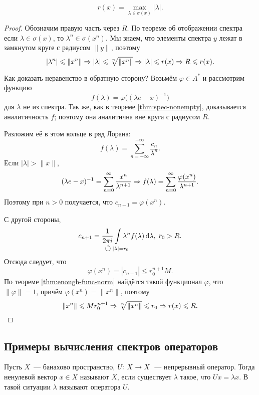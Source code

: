 \documentclass{notes}
\begin{document}
	\begin{thm}
		\[	
			r(x) = \max\limits_{\lambda \in \sigma(x)} |\lambda|.
		\]
		\begin{proof}
			Обозначим правую часть через $R$. По теореме об отображении спектра если $\lambda \in \sigma(x)$, то $\lambda^n \in \sigma(x^n)$. Мы знаем, что элементы спектра $y$ лежат в замкнутом круге с радиусом $\|y\|$, поэтому
			\[
				|\lambda^n| \leqslant \|x^n\| \Rightarrow |\lambda| \leqslant \sqrt[n]{\|x^n\|} \Rightarrow |\lambda| \leqslant r(x) \Rightarrow R \leqslant r(x).
			\]

			Как доказать неравенство в обратную сторону? Возьмём $\varphi \in A^{*}$ и рассмотрим функцию 
			\[
				f(\lambda) = \varphi\big((\lambda e - x)^{-1}\big)
			\]
			для $\lambda$ не из спектра. Так же, как в теореме \ref{thm:spec-nonempty}, доказывается аналитичность $f$; поэтому она аналитична вне круга с радиусом $R$.

			Разложим её в этом кольце в ряд Лорана:
			\[
				f(\lambda) = \sum\limits_{n = -\infty}^{+\infty} \dfrac{c_n}{\lambda^n}.
			\]
			Если $|\lambda| > \|x\|$, 
			\[
				(\lambda e - x)^{-1} = \sum\limits_{n = 0}^{\infty} \dfrac{x^n}{\lambda^{n + 1}} \Rightarrow f(\lambda) = \sum\limits_{n = 0}^{\infty} \dfrac{\varphi(x^n)}{\lambda^{n + 1}}.
			\]
			Поэтому при $n>0$ получается, что $c_{n + 1} = \varphi(x^n)$.

			С другой стороны, 
			\[
				c_{n + 1} = \dfrac{1}{2 \pi i} \int\limits_{\mathclap{\leftturn \, |\lambda| = r_0}} \lambda^n f(\lambda) \D \lambda, \; r_0 > R.
			\]
			Отсюда следует, что
			\[
				\varphi(x^n) = |c_{n + 1}| \leqslant r_0^{n + 1} M.
			\]
			По теореме \ref{thm:enough-func-norm} найдётся такой функционал $\varphi$, что $\|\varphi\| = 1$, причём $\varphi(x^n) = \|x^n\|$, поэтому
			\[
				\|x^n\| \leqslant M r_0^{n + 1} \Rightarrow \sqrt[n]{\|x^n\|} \leqslant r_0 \Rightarrow r(x) \leqslant R.
			\]
		\end{proof}
	\end{thm}

\subsection{Примеры вычисления спектров операторов}

	\begin{de}
		Пусть $X$~--- банахово пространство, $U\text{\text{:}} \; X \to X$~--- непрерывный оператор. Тогда ненулевой вектор $x \in X$ называют  $X$, если существует $\lambda$ такое, что $U x = \lambda x$. В такой ситуации $\lambda$ называют  оператора $U$.
	\end{de}
\end{document}
